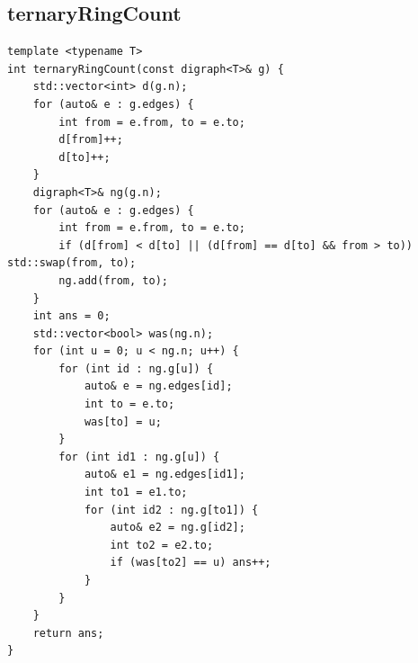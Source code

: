 \documentclass[twoside]{article}
\begin{document}
\subsection{ternaryRingCount}
\begin{lstlisting}
template <typename T>
int ternaryRingCount(const digraph<T>& g) {
    std::vector<int> d(g.n);
    for (auto& e : g.edges) {
        int from = e.from, to = e.to;
        d[from]++;
        d[to]++;
    }
    digraph<T>& ng(g.n);
    for (auto& e : g.edges) {
        int from = e.from, to = e.to;
        if (d[from] < d[to] || (d[from] == d[to] && from > to)) std::swap(from, to);
        ng.add(from, to);
    }
    int ans = 0;
    std::vector<bool> was(ng.n);
    for (int u = 0; u < ng.n; u++) {
        for (int id : ng.g[u]) {
            auto& e = ng.edges[id];
            int to = e.to;
            was[to] = u;
        }
        for (int id1 : ng.g[u]) {
            auto& e1 = ng.edges[id1];
            int to1 = e1.to;
            for (int id2 : ng.g[to1]) {
                auto& e2 = ng.g[id2];
                int to2 = e2.to;
                if (was[to2] == u) ans++;
            }
        }
    }
    return ans;
}\end{lstlisting}
\end{document}
